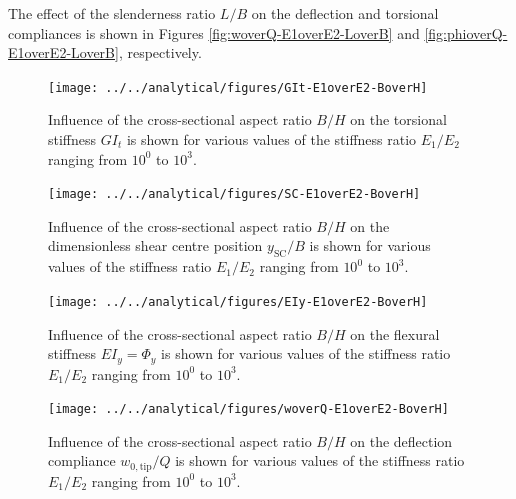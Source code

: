 The effect of the slenderness ratio $L/B$ on the deflection and torsional compliances is shown in Figures \ref{fig:woverQ-E1overE2-LoverB} and \ref{fig:phioverQ-E1overE2-LoverB}, respectively.

\begin{figure}[!htpb] %
  \centering
  \texttt{[image: ../../analytical/figures/GIt-E1overE2-BoverH]}
  \caption[Influence of the cross-sectional aspect ratio $B/H$ on the torsional stiffness $GI_t$]{Influence of the cross-sectional aspect ratio $B/H$ on the torsional stiffness $GI_t$ is shown for various values of the stiffness ratio $E_1/E_2$ ranging from $10^0$ to $10^3$. }\label{fig:GIt-E1overE2-BoverH}
\end{figure}

\begin{figure}[!htpb] %
  \centering
  \texttt{[image: ../../analytical/figures/SC-E1overE2-BoverH]}
  \caption[Influence of the cross-sectional aspect ratio $B/H$ on the dimensionless shear centre position $y_{\mathrm{SC}}/B$]{Influence of the cross-sectional aspect ratio $B/H$ on the dimensionless shear centre position $y_{\mathrm{SC}}/B$ is shown for various values of the stiffness ratio $E_1/E_2$ ranging from $10^0$ to $10^3$. }\label{fig:SC-E1overE2-BoverH}
\end{figure}

\begin{figure}[!htpb] %
  \centering
  \texttt{[image: ../../analytical/figures/EIy-E1overE2-BoverH]}
  \caption[Influence of the cross-sectional aspect ratio $B/H$ on the flexural stiffness $EI_y$]{Influence of the cross-sectional aspect ratio $B/H$ on the flexural stiffness $EI_y = \Phi_y$ is shown for various values of the stiffness ratio $E_1/E_2$ ranging from $10^0$ to $10^3$. }\label{fig:EIy-E1overE2-BoverH}
\end{figure}

\begin{figure}[!htpb] %
  \centering
  \texttt{[image: ../../analytical/figures/woverQ-E1overE2-BoverH]}
  \caption[Influence of the cross-sectional aspect ratio $B/H$ on the deflection compliance]{Influence of the cross-sectional aspect ratio $B/H$ on the deflection compliance $w_{\mathrm{0,tip}} / Q$ is shown for various values of the stiffness ratio $E_1/E_2$ ranging from $10^0$ to $10^3$. }\label{fig:woverQ-E1overE2-BoverH}
\end{figure}

